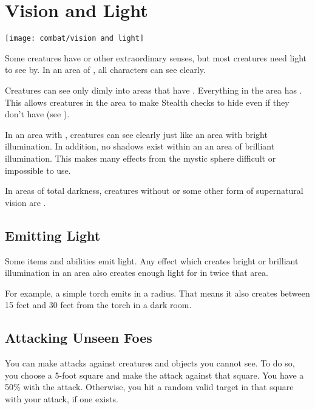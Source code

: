 \section{Vision and Light}\label{Vision and Light}
    \texttt{[image: combat/vision and light]}

    Some creatures have  or other extraordinary senses, but most creatures need light to see by. 
    In an area of , all characters can see clearly.

    Creatures can see only dimly into areas that have .
    Everything in the area has .
    This allows creatures in the area to make Stealth checks to hide even if they don't have  (see ).

    In an area with , creatures can see clearly just like an area with bright illumination.
    In addition, no shadows exist within an an area of brilliant illumination.
    This makes many effects from the  mystic sphere difficult or impossible to use.

    In areas of total darkness, creatures without  or some other form of supernatural vision are \blinded.

    \subsection{Emitting Light}
        Some items and abilities emit light.
        Any effect which creates bright or brilliant illumination in an area also creates enough light for  in twice that area.

        For example, a simple torch emits  in a \smallarea radius.
        That means it also creates  between 15 feet and 30 feet from the torch in a dark room.

    \subsection{Attacking Unseen Foes}
        You can make  attacks against creatures and objects you cannot see.
        To do so, you choose a 5-foot square and make the attack against that square.
        You have a 50\%  with the attack.
        Otherwise, you hit a random valid target in that square with your attack, if one exists.

